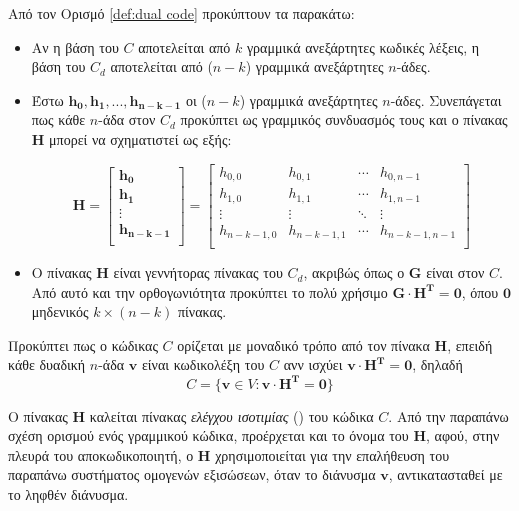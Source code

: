 Από τον Ορισμό \ref{def:dual code} προκύπτουν τα παρακάτω:
\begin{itemize}
\item Αν η βάση του $C$ αποτελείται από $k$ γραμμικά ανεξάρτητες κωδικές λέξεις, η βάση του $C_d$ αποτελείται από ($n-k$) γραμμικά ανεξάρτητες $n$-άδες.
\item Έστω $\mathbf{h_0, h_1, ..., h_{n-k-1}}$ οι ($n-k$) γραμμικά ανεξάρτητες $n$-άδες. Συνεπάγεται πως κάθε $n$-άδα στον $C_d$ προκύπτει ως γραμμικός συνδυασμός τους και ο πίνακας $\mathbf{H}$ μπορεί να σχηματιστεί ως εξής:

\begin{equation}
\mathbf{H}=\begin{bmatrix}\mathbf{h_0}\\\mathbf{h_1}\\\vdots\\\mathbf{h_{n-k-1}}\\\end{bmatrix}=\begin{bmatrix}h_{0,0} & h_{0,1} & \cdots & h_{0,n-1}\\h_{1,0} & h_{1,1} & \cdots & h_{1,n-1}\\\vdots & \vdots & \ddots & \vdots\\h_{n-k-1,0} & h_{n-k-1,1} & \cdots & h_{n-k-1,n-1}\\\end{bmatrix}
\label{eq:parity check matrix}
\end{equation}


\item Ο πίνακας $\mathbf{H}$ είναι γεννήτορας πίνακας του $C_d$, ακριβώς όπως ο $\mathbf{G}$ είναι στον $C$. Από αυτό και την ορθογωνιότητα προκύπτει το πολύ χρήσιμο $\mathbf{G} \cdot \mathbf{H^T} = \mathbf{0}$, όπου $\mathbf{0}$ μηδενικός $k \times (n-k)$ πίνακας.
\end{itemize}

Προκύπτει πως ο κώδικας $C$ ορίζεται με μοναδικό τρόπο από τον πίνακα $\mathbf{H}$, επειδή κάθε δυαδική $n$-άδα $\mathbf{v}$ είναι κωδικολέξη του $C$ ανν
ισχύει $\mathbf{v} \cdot \mathbf{H^T} = \mathbf{0}$, δηλαδή
\begin{equation}
C=\lbrace\mathbf{v}\in V:\mathbf{v} \cdot \mathbf{H^T} = \mathbf{0}\rbrace
\label{eq:decoding equation}
\end{equation}

Ο πίνακας $\mathbf{H}$ καλείται πίνακας \textit{ελέγχου ισοτιμίας} () του κώδικα $C$. Από την παραπάνω σχέση ορισμού ενός γραμμικού κώδικα, προέρχεται και το όνομα του $\mathbf{H}$, αφού, στην πλευρά του αποκωδικοποιητή, ο $\mathbf{H}$ χρησιμοποιείται για την επαλήθευση του παραπάνω συστήματος ομογενών εξισώσεων, όταν το διάνυσμα $\mathbf{v}$, αντικατασταθεί με το ληφθέν διάνυσμα.

